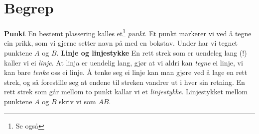 




\newpage
\section{Begrep}
\textbf{Punkt}\os
En bestemt plassering kalles et\footnote{Se også } \textit{punkt}. Et punkt markerer vi ved å tegne ein prikk, som vi gjerne setter navn på med en bokstav. Under har vi tegnet punktene $ A $ og $ B $.
\textbf{Linje og linjestykke}\os
En rett strek som er uendeleg lang (!) kaller vi ei \textit{linje}. At linja er uendelig lang, gjør at vi aldri kan \textsl{tegne} ei linje, vi kan bare \textsl{tenke} oss ei linje. Å tenke seg ei linje kan man gjøre ved å lage en rett strek, og så forestille seg at endene til streken vandrer ut i hver sin retning.
En rett strek som går mellom to punkt kallar vi et \textit{linjestykke}.
Linjestykket mellom punktene $ A $ og $ B $ skriv vi som $ AB $. 

